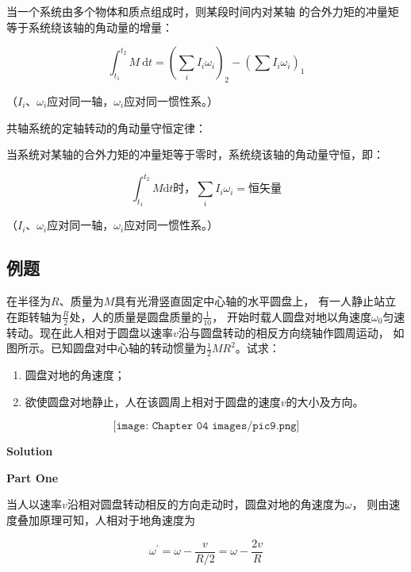\documentclass[
	12pt, %
	a4paper, %
]{myLegrandOrangeBook}
\newcommand{\rmd}{\mathrm{d}}
\begin{document}
    当一个系统由多个物体和质点组成时，则某段时间内对某轴
    的合外力矩的冲量矩等于系统绕该轴的角动量的增量：

    $$
    \int_{t_1}^{t_2} M \mathrm{~d} t=\left(\sum_i I_i \omega_i\right)_2-\left(\sum I_i \omega_i\right)_1
    $$

    （\(I_i\)、\(\omega_i\)应对同一轴，\(\omega_i\)应对同一惯性系。）

    共轴系统的定轴转动的角动量守恒定律：

    当系统对某轴的合外力矩的冲量矩等于零时，系统绕该轴的角动量守恒，即：

    \begin{equation}
        \int_{t_1}^{t_2} M \rmd t \text{时，} \sum_{i} I_i \omega_i = \text{恒矢量}
    \end{equation}

    （\(I_i\)、\(\omega_i\)应对同一轴，\(\omega_i\)应对同一惯性系。）

\subsection{例题}

\begin{exercise}
    在半径为\(R\)、质量为\(M\)具有光滑竖直固定中心轴的水平圆盘上，
    有一人静止站立在距转轴为\(\frac{R}{2}\)处，人的质量是圆盘质量的\(\frac{1}{10}\)，
    开始时载人圆盘对地以角速度\(\omega_0\)匀速转动。现在此人相对于圆盘以速率\(v\)沿与圆盘转动的相反方向绕轴作圆周运动，
    如图所示。已知圆盘对中心轴的转动惯量为\(\frac{1}{2}MR^2\)。试求：

    \begin{enumerate}
        \item 圆盘对地的角速度；
        \item 欲使圆盘对地静止，人在该圆周上相对于圆盘的速度\(v\)的大小及方向。
    \end{enumerate}

    \[
        \texttt{[image: Chapter 04 images/pic9.png]}
    \]
\end{exercise}

    \vspace{1em}
    \textbf{Solution}
    
    \textbf{Part One}

    当人以速率\(v\)沿相对圆盘转动相反的方向走动时，圆盘对地的角速度为\(\omega\)，
    则由速度叠加原理可知，人相对于地角速度为

    $$
        \omega^{\prime}=\omega-\frac{v}{R / 2}=\omega-\frac{2 v}{R}
    $$
\end{document}
